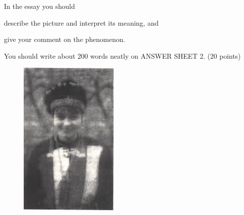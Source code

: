 In the essay you should
\begin{listwrite}
\item 
 describe the picture and interpret its meaning, and



\item
 give your comment on the phenomenon.
\end{listwrite}

You should write about 200 words neatly on ANSWER SHEET 2. (20 points)

\begin{figure}[h!]
	\centering
	\includegraphics[width=0.3\linewidth]{picture/2002.png}
\end{figure}






